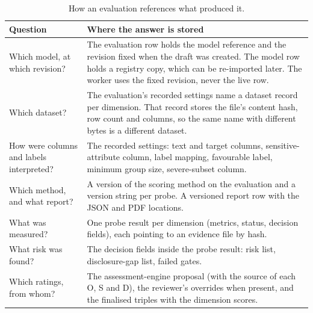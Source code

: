 \begin{table}[!htbp]
\centering\small
\caption{How an evaluation references what produced it.}\label{tab:entities}
\begin{tabularx}{\textwidth}{|>{\raggedright\arraybackslash}p{3.3cm}|L|}
\hline
\textbf{Question} & \textbf{Where the answer is stored}\\
\hline
Which model, at which revision? & The evaluation row holds the model reference and the revision fixed when the draft was created. The model row holds a registry copy, which can be re-imported later. The worker uses the fixed revision, never the live row.\\ \hline
Which dataset? & The evaluation's recorded settings name a dataset record per dimension. That record stores the file's content hash, row count and columns, so the same name with different bytes is a different dataset.\\ \hline
How were columns and labels interpreted? & The recorded settings: text and target columns, sensitive-attribute column, label mapping, favourable label, minimum group size, severe-subset column.\\ \hline
Which method, and what report? & A version of the scoring method on the evaluation and a version string per probe. A versioned report row with the JSON and PDF locations.\\ \hline
What was measured? & One probe result per dimension (metrics, status, decision fields), each pointing to an evidence file by hash.\\ \hline
What risk was found? & The decision fields inside the probe result: risk list, disclosure-gap list, failed gates.\\ \hline
Which ratings, from whom? & The assessment-engine proposal (with the source of each O, S and D), the reviewer's overrides when present, and the finalised triples with the dimension scores.\\
\hline
\end{tabularx}
\end{table}


